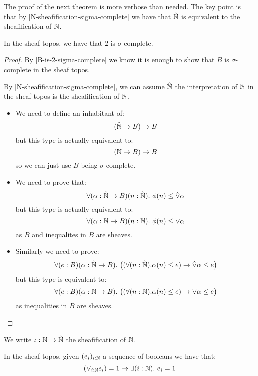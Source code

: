 The proof of the next theorem is more verbose than needed. The key point is that by \cref{N-sheafification-sigma-complete} we have that $\hat{\mathbb{N}}$ is equivalent to the sheafification of $\mathbb{N}$. 

\begin{lemma}\label{2-sigma-complete-sheaf}
In the sheaf topos, we have that $2$ is $\sigma$-complete.
\end{lemma}

\begin{proof}
By \cref{B-is-2-sigma-complete} we know it is enough to show that $B$ is $\sigma$-complete in the sheaf topos. 

By \cref{N-sheafification-sigma-complete}, we can assume $\hat{\mathbb{N}}$ the interpretation of $\mathbb{N}$ in the sheaf topos is the sheafification of $\mathbb{N}$.
\begin{itemize}
\item We need to define an inhabitant of:
\[(\hat{\mathbb{N}} \to B) \to B\]
but this type is actually equivalent to:
\[(\mathbb{N}\to B) \to B\]
so we can just use $B$ being $\sigma$-complete.
\item We need to prove that:
\[\forall (\alpha:\hat{\mathbb{N}}\to B)(n:\hat{\mathbb{N}}).\ \phi(n)\leq \hat{\lor}\alpha\]
but this type is actually equivalent to:
\[\forall (\alpha:\mathbb{N}\to B)(n:\mathbb{N}).\ \phi(n)\leq \lor\alpha\]
as $B$ and inequalites in $B$ are sheaves.
\item Similarly we need to prove:
\[\forall (e:B)(\alpha:\hat{\mathbb{N}}\to B).\ \big((\forall(n:\hat{\mathbb{N}}). \alpha(n)\leq e) \to \hat{\lor} \alpha \leq e\big)\]
but this type is equivalent to:
\[\forall (e:B)(\alpha:\N\to B).\ \big((\forall(n:\N). \alpha(n)\leq e) \to \lor \alpha \leq e\big)\]
as inequalities in $B$ are sheaves.
\end{itemize}
\end{proof}

We write $\iota: \mathbb{N}\to \hat{\mathbb{N}}$ the sheafification of $\mathbb{N}$.

\begin{lemma}\label{sup-gives-exists}
In the sheaf topos, given $(e_i)_{i:\mathbb{N}}$ a sequence of booleans we have that:
\[(\lor_{i:\N}e_i) = 1 \to \exists(i:\N).\ e_i=1\]
\end{lemma}


